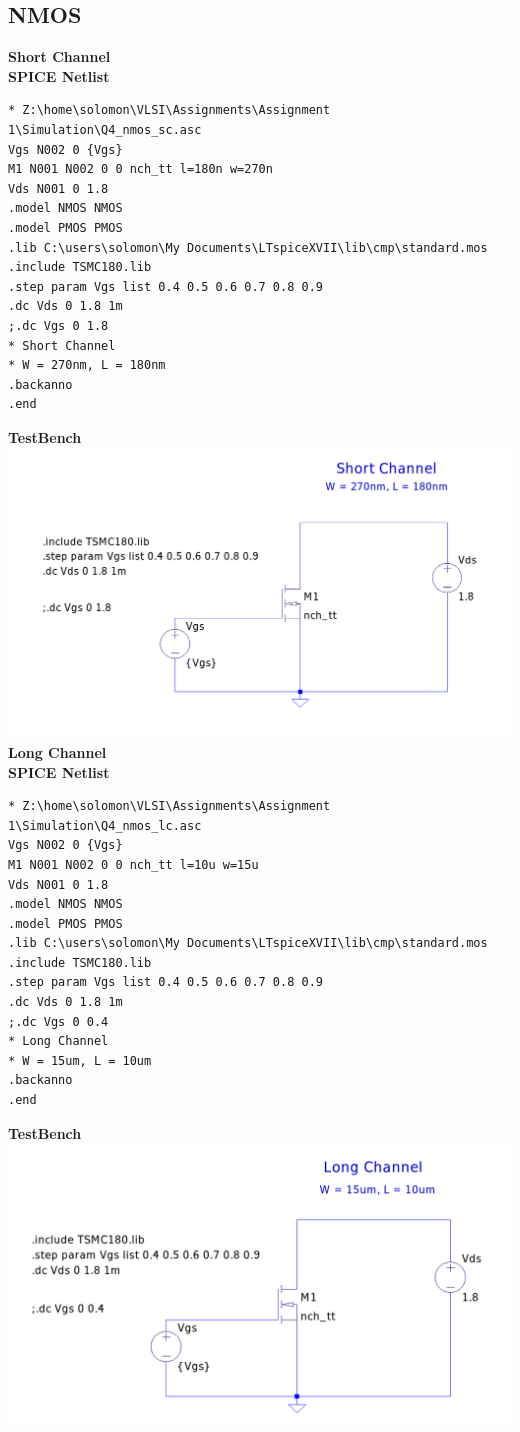 \documentclass{article}
\begin{document}
\subsection{NMOS}
\textbf{Short Channel}\\
\textbf{SPICE Netlist}
\begin{lstlisting}
* Z:\home\solomon\VLSI\Assignments\Assignment 1\Simulation\Q4_nmos_sc.asc
Vgs N002 0 {Vgs}
M1 N001 N002 0 0 nch_tt l=180n w=270n
Vds N001 0 1.8
.model NMOS NMOS
.model PMOS PMOS
.lib C:\users\solomon\My Documents\LTspiceXVII\lib\cmp\standard.mos
.include TSMC180.lib
.step param Vgs list 0.4 0.5 0.6 0.7 0.8 0.9
.dc Vds 0 1.8 1m
;.dc Vgs 0 1.8
* Short Channel
* W = 270nm, L = 180nm
.backanno
.end
\end{lstlisting}
\textbf{TestBench}\\
\includegraphics[scale=0.28]{./figs/Q4_nmos_sc_tb.png}\\
 \newline
\textbf{Long Channel}\\
\textbf{SPICE Netlist}
\begin{lstlisting}
* Z:\home\solomon\VLSI\Assignments\Assignment 1\Simulation\Q4_nmos_lc.asc
Vgs N002 0 {Vgs}
M1 N001 N002 0 0 nch_tt l=10u w=15u
Vds N001 0 1.8
.model NMOS NMOS
.model PMOS PMOS
.lib C:\users\solomon\My Documents\LTspiceXVII\lib\cmp\standard.mos
.include TSMC180.lib
.step param Vgs list 0.4 0.5 0.6 0.7 0.8 0.9
.dc Vds 0 1.8 1m
;.dc Vgs 0 0.4
* Long Channel
* W = 15um, L = 10um
.backanno
.end
\end{lstlisting}
\textbf{TestBench}\\
\includegraphics[scale=0.28]{./figs/Q4_nmos_lc_tb.png}\\
\end{document}
